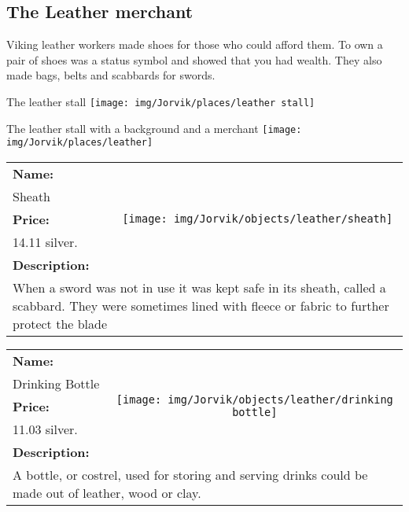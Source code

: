 

\clearpage
\subsection{The Leather merchant}
\label{sec:appendix:moj:leather}

Viking leather workers made shoes for those who could afford them. To own a pair of shoes was a status symbol and showed that you had wealth. They also made bags, belts and scabbards for swords.

\begin{display}{The leather stall}
	\label{fig:appendix:moj:places:leather:stall}
	\texttt{[image: img/Jorvik/places/leather stall]}
\end{display}

\begin{display}{The leather stall with a background and a merchant}
	\label{fig:appendix:moj:places:leather}
	\texttt{[image: img/Jorvik/places/leather]}
\end{display}
\clearpage


\begin{table}[ht!]
	\centering
	\begin{tabular}{ p{3cm} c }\toprule
		\textbf{Name:} & \multirow{5}{*}{\texttt{[image: img/Jorvik/objects/leather/sheath]}}\\
		Sheath & \\ 
		\textbf{Price:} & \\
		14.11 silver. & \\ 
		\textbf{Description:} & \\
		\multicolumn{2}{p{12cm}}{When a sword was not in use it was kept safe in its sheath, called a scabbard. They were sometimes lined with fleece or fabric to further protect the blade}\\
		\bottomrule
	\end{tabular}
\end{table}

\begin{table}[ht!]
	\centering
	\begin{tabular}{ p{3cm} c }\toprule
		\textbf{Name:} & \multirow{5}{*}{\texttt{[image: img/Jorvik/objects/leather/drinking bottle]}}\\
		Drinking Bottle & \\ 
		\textbf{Price:} & \\
		11.03 silver. & \\ 
		\textbf{Description:} & \\
		\multicolumn{2}{p{12cm}}{A bottle, or costrel, used for storing and serving drinks could be made out of leather, wood or clay.}\\
		\bottomrule
	\end{tabular}
\end{table}

